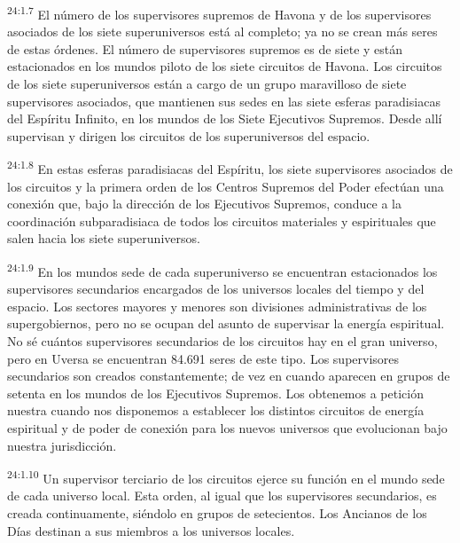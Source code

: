 \par
\textsuperscript{24:1.7} El número de los supervisores supremos de Havona y de los supervisores asociados de los siete superuniversos está al completo; ya no se crean más seres de estas órdenes. El número de supervisores supremos es de siete y están estacionados en los mundos piloto de los siete circuitos de Havona. Los circuitos de los siete superuniversos están a cargo de un grupo maravilloso de siete supervisores asociados, que mantienen sus sedes en las siete esferas paradisiacas del Espíritu Infinito, en los mundos de los Siete Ejecutivos Supremos. Desde allí supervisan y dirigen los circuitos de los superuniversos del espacio.

\par
\textsuperscript{24:1.8} En estas esferas paradisiacas del Espíritu, los siete supervisores asociados de los circuitos y la primera orden de los Centros Supremos del Poder efectúan una conexión que, bajo la dirección de los Ejecutivos Supremos, conduce a la coordinación subparadisiaca de todos los circuitos materiales y espirituales que salen hacia los siete superuniversos.

\par
\textsuperscript{24:1.9} En los mundos sede de cada superuniverso se encuentran estacionados los supervisores secundarios encargados de los universos locales del tiempo y del espacio. Los sectores mayores y menores son divisiones administrativas de los supergobiernos, pero no se ocupan del asunto de supervisar la energía espiritual. No sé cuántos supervisores secundarios de los circuitos hay en el gran universo, pero en Uversa se encuentran 84.691 seres de este tipo. Los supervisores secundarios son creados constantemente; de vez en cuando aparecen en grupos de setenta en los mundos de los Ejecutivos Supremos. Los obtenemos a petición nuestra cuando nos disponemos a establecer los distintos circuitos de energía espiritual y de poder de conexión para los nuevos universos que evolucionan bajo nuestra jurisdicción.

\par
\textsuperscript{24:1.10} Un supervisor terciario de los circuitos ejerce su función en el mundo sede de cada universo local. Esta orden, al igual que los supervisores secundarios, es creada continuamente, siéndolo en grupos de setecientos. Los Ancianos de los Días destinan a sus miembros a los universos locales.

